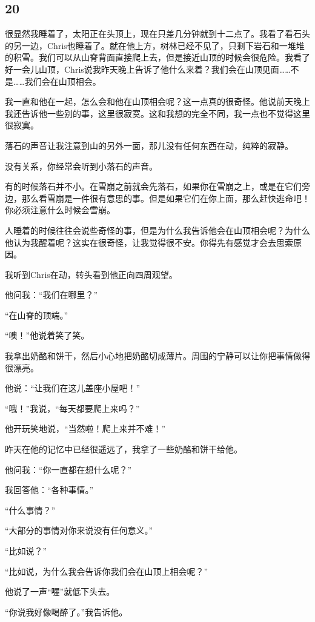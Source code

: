 \documentclass[UTF8]{article}
\begin{document}
\subsection*{20}
\par 很显然我睡着了，太阳正在头顶上，现在只差几分钟就到十二点了。我看了看石头的另一边，Chris也睡着了。就在他上方，树林已经不见了，只剩下岩石和一堆堆的积雪。我们可以从山脊背面直接爬上去，但是接近山顶的时候会很危险。我看了好一会儿山顶，Chris说我昨天晚上告诉了他什么来着？我们会在山顶见面……不是……我们会在山顶相会。
\par 我一直和他在一起，怎么会和他在山顶相会呢？这一点真的很奇怪。他说前天晚上我还告诉他一些别的事，这里很寂寞。这和我想的完全不同，我一点也不觉得这里很寂寞。
\par 落石的声音让我注意到山的另外一面，那儿没有任何东西在动，纯粹的寂静。
\par 没有关系，你经常会听到小落石的声音。
\par 有的时候落石并不小。在雪崩之前就会先落石，如果你在雪崩之上，或是在它们旁边，那么看雪崩是一件很有意思的事。但是如果它们在你上面，那么赶快逃命吧！你必须注意什么时候会雪崩。
\par 人睡着的时候往往会说些奇怪的事，但是为什么我告诉他会在山顶相会呢？为什么他认为我醒着呢？这实在很奇怪，让我觉得很不安。你得先有感觉才会去思索原因。
\par 我听到Chris在动，转头看到他正向四周观望。
\par 他问我：“我们在哪里？”
\par “在山脊的顶端。”
\par “噢！”他说着笑了笑。
\par 我拿出奶酪和饼干，然后小心地把奶酪切成薄片。周围的宁静可以让你把事情做得很漂亮。
\par 他说：“让我们在这儿盖座小屋吧！”
\par “哦！”我说，“每天都要爬上来吗？”
\par 他开玩笑地说，“当然啦！爬上来并不难！”
\par 昨天在他的记忆中已经很遥远了，我拿了一些奶酪和饼干给他。
\par 他问我：“你一直都在想什么呢？”
\par 我回答他：“各种事情。”
\par “什么事情？”
\par “大部分的事情对你来说没有任何意义。”
\par “比如说？”
\par “比如说，为什么我会告诉你我们会在山顶上相会呢？”
\par 他说了一声“喔”就低下头去。
\par “你说我好像喝醉了。”我告诉他。
\end{document}
